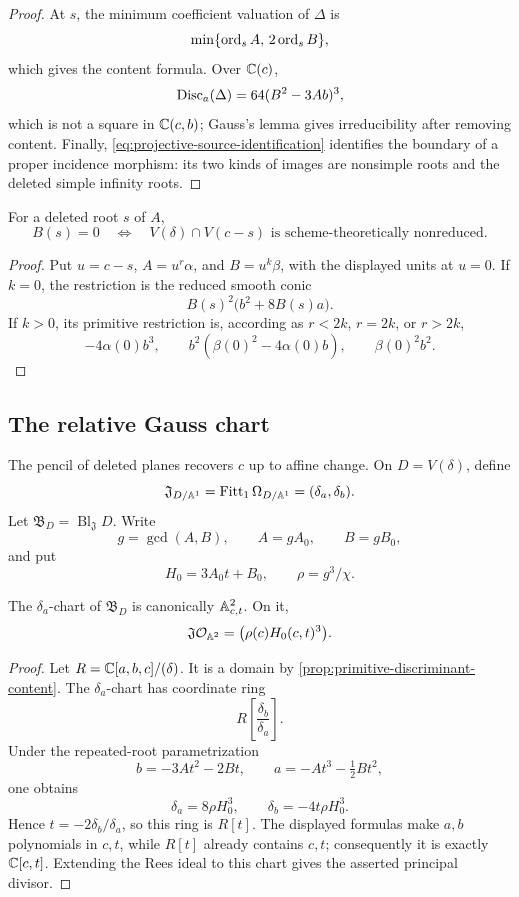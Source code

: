 \begin{proof}
At \(s\), the minimum coefficient valuation of \(\Delta\) is
\[
\min\{\operatorname{ord}_sA,\,2\operatorname{ord}_sB\},
\]
which gives the content formula.  Over \(\mathbb C(c)\),
\[
\operatorname{Disc}_a(\Delta)=64(B^2-3Ab)^3,
\]
which is not a square in \(\mathbb C(c,b)\); Gauss's lemma gives irreducibility
after removing content.  Finally,
\cref{eq:projective-source-identification} identifies the boundary of a
proper incidence morphism: its two kinds of images are nonsimple roots and
the deleted simple infinity roots.
\end{proof}

\begin{proposition}
\label{prop:intrinsic-common-planes}
For a deleted root \(s\) of \(A\),
\[
B(s)=0
\quad\Longleftrightarrow\quad
V(\delta)\cap V(c-s)
\text{ is scheme-theoretically nonreduced}.
\]
\end{proposition}

\begin{proof}
Put \(u=c-s\), \(A=u^r\alpha\), and \(B=u^k\beta\), with the displayed
units at \(u=0\).  If \(k=0\), the restriction is the reduced smooth conic
\[
B(s)^2\bigl(b^2+8B(s)a\bigr).
\]
If \(k>0\), its primitive restriction is, according as
\(r<2k\), \(r=2k\), or \(r>2k\),
\[
-4\alpha(0)b^3,\qquad
b^2(\beta(0)^2-4\alpha(0)b),\qquad
\beta(0)^2b^2.
\]
\end{proof}

\subsection{The relative Gauss chart}

The pencil of deleted planes recovers \(c\) up to affine change.  On
\(D=V(\delta)\), define
\[
\mathfrak J_{D/\mathbb A^1}
=\operatorname{Fitt}_1\Omega_{D/\mathbb A^1}
=(\delta_a,\delta_b).
\]
Let \(\mathfrak B_D=\operatorname{Bl}_{\mathfrak J}D\).  Write
\[
g=\gcd(A,B),\qquad A=gA_0,\qquad B=gB_0,
\]
and put
\[
H_0=3A_0t+B_0,\qquad \rho=g^3/\chi.
\]

\begin{proposition}
\label{prop:relative-jacobian-chart}
The \(\delta_a\)-chart of \(\mathfrak B_D\) is canonically
\(\mathbb A^2_{c,t}\).  On it,
\[
\mathfrak J\mathcal O_{\mathbb A^2}
=\bigl(\rho(c)H_0(c,t)^3\bigr).
\]
\end{proposition}

\begin{proof}
Let \(R=\mathbb C[a,b,c]/(\delta)\).  It is a domain by
\cref{prop:primitive-discriminant-content}.  The \(\delta_a\)-chart has
coordinate ring
\[
R\left[\frac{\delta_b}{\delta_a}\right].
\]
Under the repeated-root parametrization
\[
b=-3At^2-2Bt,\qquad
a=-At^3-\tfrac12Bt^2,
\]
one obtains
\[
\delta_a=8\rho H_0^3,\qquad
\delta_b=-4t\rho H_0^3.
\]
Hence \(t=-2\delta_b/\delta_a\), so this ring is \(R[t]\).  The displayed
formulas make \(a,b\) polynomials in \(c,t\), while \(R[t]\) already
contains \(c,t\); consequently it is exactly \(\mathbb C[c,t]\).  Extending the
Rees ideal to this chart gives the asserted principal divisor.
\end{proof}

